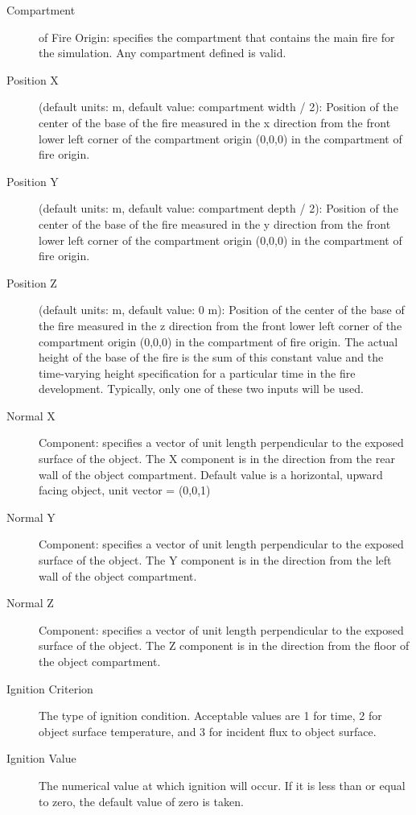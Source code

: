 \begin{description}
\item[Compartment] of Fire Origin: specifies the compartment that contains the main fire for the simulation.  Any compartment defined is valid.

\item[Position X] (default units: m, default value: compartment width / 2): Position of the center of the base of the fire measured in the x direction from the front lower left corner of the compartment origin (0,0,0) in the compartment of fire origin.

\item[Position Y] (default units: m, default value: compartment depth / 2): Position of the center of the base of the fire measured in the y direction from the front lower left corner of the compartment origin (0,0,0) in the compartment of fire origin.

\item[Position Z] (default units: m, default value: 0 m): Position of the center of the base of the fire measured in the z direction from the front lower left corner of the compartment origin (0,0,0) in the compartment of fire origin. The actual height of the base of the fire is the sum of this constant value and the time-varying height specification for a particular time in the fire development. Typically, only one of these two inputs will be used.

\item[Normal  X] Component: specifies a vector of unit length perpendicular to the exposed surface of the object. The X component is in the direction from the rear wall of the object compartment. Default value is a horizontal, upward facing object, unit vector = (0,0,1)

\item[Normal  Y] Component: specifies a vector of unit length perpendicular to the exposed surface of the object. The Y component is in the direction from the left wall of the object compartment.

\item[Normal  Z] Component: specifies a vector of unit length perpendicular to the exposed surface of the object. The Z component is in the direction from the floor of the object compartment.

\item[Ignition Criterion] The type of ignition condition. Acceptable values are 1 for time, 2 for object surface temperature, and 3 for incident flux to object surface.

\item[Ignition Value] The numerical value at which ignition will occur. If it is less than or equal to zero, the default value of zero is taken.
\end{description}

